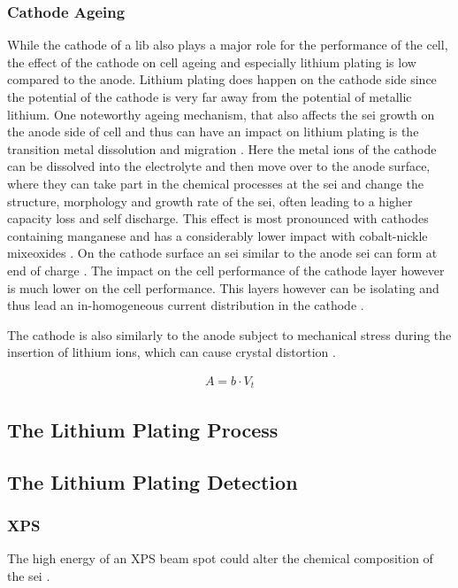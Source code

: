  \subsubsection{Cathode Ageing}
While the cathode of a \gls{lib} also plays a major role for the performance of the cell, the effect of the cathode on cell ageing and especially lithium plating is low compared to the anode. Lithium plating does happen on the cathode side since the potential of the cathode is very far away from the potential of metallic lithium. One noteworthy ageing mechanism, that also affects the \gls{sei} growth on the anode side of cell and thus can have an impact on lithium plating is the transition metal dissolution and migration \cite{Palacin.2018,Lin.2015,Agubra.2013,Vetter.2005}. Here the metal ions of the cathode can be dissolved into the electrolyte and then move over to the anode surface, where they can take part in the chemical processes at the \gls{sei} and change the structure, morphology and growth rate of the \gls{sei}, often leading to a higher capacity loss and self discharge. This effect is most pronounced with cathodes containing manganese and has a considerably lower impact with cobalt-nickle mixeoxides \cite{Amatucci.1996,Liu.2003}. On the cathode surface an \gls{sei} similar to the anode \gls{sei} can form at end of charge \cite{Palacin.2018}. The impact on the cell performance of the cathode layer however is much lower on the cell performance. This layers however can be isolating and thus lead an in-homogeneous current distribution in the cathode \cite{Agubra.2013}. \par
The cathode is also similarly to the anode subject to mechanical stress during the insertion of lithium ions, which can cause crystal distortion \cite{Lin.2015}. 


\begin{align*}
    A = b\cdot V_t
\end{align*}


\subsection{The Lithium Plating Process}
\label{liplating}

\subsection{The Lithium Plating Detection}
\subsubsection{XPS}
The high energy of an XPS beam spot could alter the chemical composition of the \gls{sei} \cite{Bhattacharya.2012}.